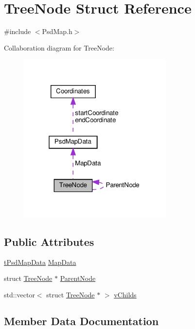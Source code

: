 \hypertarget{struct_tree_node}{}\section{Tree\+Node Struct Reference}
\label{struct_tree_node}


{\ttfamily \#include $<$Psd\+Map.\+h$>$}



Collaboration diagram for Tree\+Node\+:\nopagebreak
\begin{figure}[H]
\begin{center}
\leavevmode
\includegraphics[width=220pt]{struct_tree_node__coll__graph}
\end{center}
\end{figure}
\subsection*{Public Attributes}
\begin{DoxyCompactItemize}
\item 
\hyperlink{_psd_message_decoder_8h_ad54e183dd7c544312c06d4bd6279ebdc}{t\+Psd\+Map\+Data} \hyperlink{struct_tree_node_a37bb860a60a8145caa4d2d2227f72e8b}{Map\+Data}
\item 
struct \hyperlink{struct_tree_node}{Tree\+Node} $\ast$ \hyperlink{struct_tree_node_a2e4d7b1482b67b0be9a09ba86e225300}{Parent\+Node}
\item 
std\+::vector$<$ struct \hyperlink{struct_tree_node}{Tree\+Node} $\ast$ $>$ \hyperlink{struct_tree_node_adb4d9e37e7a3b5fddbabf56ac56eccd7}{v\+Childs}
\end{DoxyCompactItemize}


\subsection{Member Data Documentation}
\mbox{\label{struct_tree_node_a37bb860a60a8145caa4d2d2227f72e8b}} 
